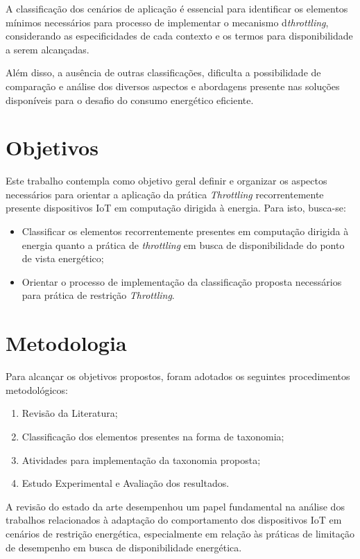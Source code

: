 A classificação dos cenários de aplicação é essencial para identificar os elementos mínimos necessários para processo de implementar o mecanismo d\textit{throttling}, considerando as especificidades de cada contexto e os termos para disponibilidade a serem alcançadas.

Além disso, a ausência de outras classificações, dificulta a possibilidade de comparação e análise dos diversos aspectos e abordagens presente nas soluções disponíveis para o desafio do consumo energético eficiente.



\section{Objetivos}

Este trabalho contempla como objetivo geral definir e organizar os aspectos necessários para orientar a aplicação da prática \textit{Throttling} recorrentemente presente dispositivos \acs{IoT} em computação dirigida à energia. Para isto, busca-se:

\begin{itemize}
	\item Classificar os elementos recorrentemente presentes em computação dirigida à energia quanto a prática de \textit{throttling} em busca de disponibilidade do ponto de vista energético;
	\item Orientar o processo de implementação da classificação proposta necessários para prática de restrição \textit{Throttling}. 
\end{itemize}

\section{Metodologia}

Para alcançar os objetivos propostos, foram adotados os seguintes procedimentos metodológicos:
\begin{enumerate}
	
	\item Revisão da Literatura;
	\item Classificação dos elementos presentes na forma de taxonomia;
	\item Atividades para implementação da taxonomia proposta;
	\item Estudo Experimental e Avaliação dos resultados.
\end{enumerate}

A revisão do estado da arte desempenhou um papel fundamental na análise dos trabalhos relacionados à adaptação do comportamento dos dispositivos \acs{IoT} em cenários de restrição energética, especialmente em relação às práticas de limitação de desempenho em busca de disponibilidade energética. 

